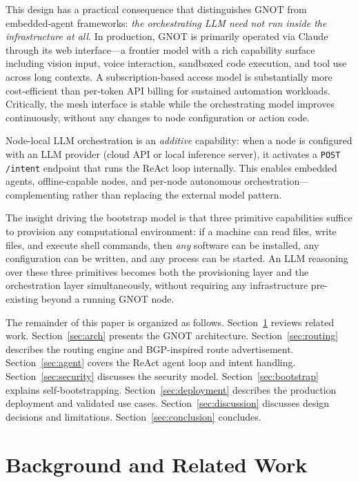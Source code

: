 \documentclass[10pt,twocolumn]{article}
\begin{document}
This design has a practical consequence that distinguishes GNOT from
embedded-agent frameworks: \emph{the orchestrating LLM need not run
inside the infrastructure at all}. In production, GNOT is primarily
operated via Claude through its web interface---a frontier model with
a rich capability surface including vision input, voice interaction,
sandboxed code execution, and tool use across long contexts. A
subscription-based access model is substantially more cost-efficient
than per-token API billing for sustained automation workloads.
Critically, the mesh interface is stable while the orchestrating model
improves continuously, without any changes to node configuration or
action code.

Node-local LLM orchestration is an \emph{additive} capability: when a
node is configured with an LLM provider (cloud API or local inference
server), it activates a \texttt{POST /intent} endpoint that runs the
ReAct loop internally. This enables embedded agents, offline-capable
nodes, and per-node autonomous orchestration---complementing rather
than replacing the external model pattern.

The insight driving the bootstrap model is that three primitive
capabilities suffice to provision any computational environment: if a
machine can read files, write files, and execute shell commands, then
\emph{any} software can be installed, any configuration can be written,
and any process can be started. An LLM reasoning over these three
primitives becomes both the provisioning layer and the orchestration
layer simultaneously, without requiring any infrastructure pre-existing
beyond a running GNOT node.

The remainder of this paper is organized as follows.
Section~\ref{sec:background} reviews related work.
Section~\ref{sec:arch} presents the GNOT architecture.
Section~\ref{sec:routing} describes the routing engine and BGP-inspired
route advertisement. Section~\ref{sec:agent} covers the ReAct agent
loop and intent handling. Section~\ref{sec:security} discusses the
security model. Section~\ref{sec:bootstrap} explains self-bootstrapping.
Section~\ref{sec:deployment} describes the production deployment and
validated use cases. Section~\ref{sec:discussion} discusses design
decisions and limitations. Section~\ref{sec:conclusion} concludes.

\section{Background and Related Work}
\label{sec:background}
\end{document}
